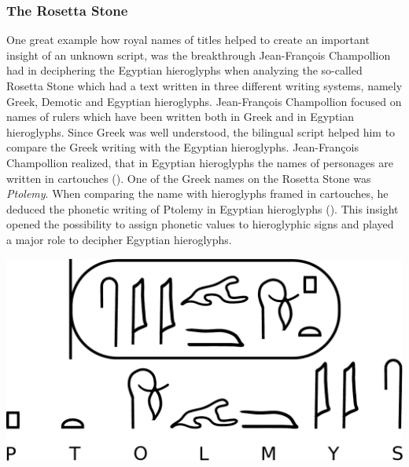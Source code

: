 \documentclass[../main.tex]{subfiles}
\begin{document}
\subsubsection{The Rosetta Stone}
One great example how royal names of titles helped to create an important insight of an unknown 
script, was the breakthrough Jean-Fran\c{c}ois Champollion had in deciphering the 
Egyptian hieroglyphs when analyzing the so-called Rosetta Stone which had a text written in 
three different writing systems, namely Greek, Demotic and Egyptian hieroglyphs.
Jean-Fran\c{c}ois Champollion focused on names of rulers which have been written both in 
Greek and in Egyptian hieroglyphs. 
Since Greek was well understood, the bilingual script helped him to compare the Greek writing with 
the Egyptian hieroglyphs.
Jean-Fran\c{c}ois Champollion realized, that in Egyptian hieroglyphs the names of personages 
are written in cartouches (\cite[215]{coulmas1991}).
One of the Greek names on the Rosetta Stone was \emph{Ptolemy}.
When comparing the name with hieroglyphs framed in cartouches, he deduced the phonetic writing 
of Ptolemy in Egyptian hieroglyphs ().
This insight opened the possibility to assign phonetic values to hieroglyphic signs and 
played a major role to decipher Egyptian hieroglyphs. 
\begin{center}
    \includegraphics[width=.7\textwidth,keepaspectratio]{img/ptolemy-cartouche}
    \label{fig:terminology-ptolemy-cartouche}
\end{center}
\end{document}
